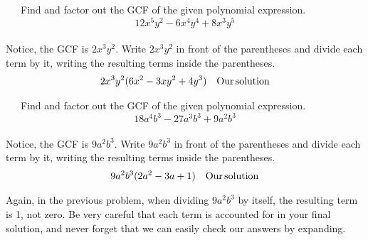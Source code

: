 \begin{example}~~~Find and factor out the GCF of the given polynomial expression.
$$ 12 x^5 y^2 - 6 x^4 y^4 + 8 x^3 y^5$$
~\\
Notice, the GCF is $2x^3y^2$.  Write $2x^3y^2$ in front of the parentheses and divide each term by it, writing the resulting terms inside the parentheses. 
  \begin{eqnarray*}
    2 x^3 y^2 (6 x^2 - 3 x y^2 + 4 y^3) &  & \operatorname{Our} \operatorname{solution}
  \end{eqnarray*}
\end{example}

\begin{example}~~~Find and factor out the GCF of the given polynomial expression.
$$18 a^4 b^3 - 27 a^3 b^3 + 9 a^2 b^3$$
~\\
Notice, the GCF is $9 a^2 b^3$.  Write $9 a^2 b^3$ in front of the parentheses and divide each term by it, writing the resulting terms inside the parentheses.  
  \begin{eqnarray*}
    9 a^2 b^3 (2 a^2 - 3 a + 1) &  & \operatorname{Our} \operatorname{solution}
  \end{eqnarray*}
\end{example}

Again, in the previous problem, when dividing $9 a^2 b^3$ by itself, the
resulting term is 1, not zero. Be very careful that each term is accounted for in your
final solution, and never forget that we can easily check our answers by expanding.

%
